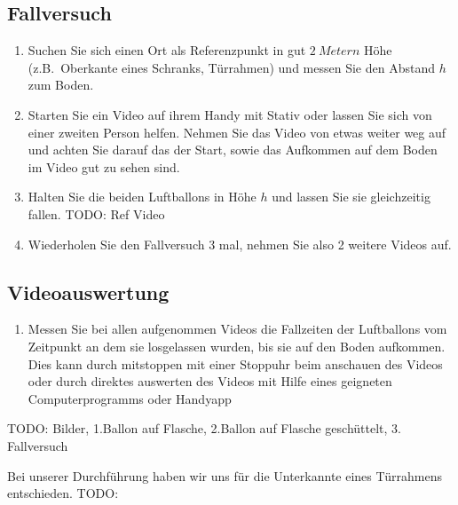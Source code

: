 \documentclass{article}
\begin{document}
        \subsection{Fallversuch}
            \begin{enumerate}[resume]
                \item Suchen Sie sich einen Ort als Referenzpunkt in gut \(\SI{2}{Metern}\) Höhe (z.B.\ Oberkante eines Schranks, Türrahmen) und messen Sie
                den Abstand \(h\) zum Boden.
                \item Starten Sie ein Video auf ihrem Handy mit Stativ oder lassen Sie sich von einer zweiten Person helfen.
                Nehmen Sie das Video von etwas weiter weg auf und achten Sie darauf das der Start, sowie das Aufkommen auf dem Boden im Video gut zu sehen sind.
                \item Halten Sie die beiden Luftballons in Höhe \(h\) und lassen Sie sie gleichzeitig fallen. TODO: Ref Video
                \item Wiederholen Sie den Fallversuch 3 mal, nehmen Sie also 2 weitere Videos auf.
            \end{enumerate}
            
        \subsection{Videoauswertung}
            \begin{enumerate}
                \item Messen Sie bei allen aufgenommen Videos die Fallzeiten der Luftballons vom Zeitpunkt an dem sie losgelassen wurden, bis sie auf den Boden aufkommen.
                Dies kann durch mitstoppen mit einer Stoppuhr beim anschauen des Videos oder durch direktes auswerten des Videos mit Hilfe eines geigneten Computerprogramms oder Handyapp
            \end{enumerate}
        TODO: Bilder, 1.Ballon auf Flasche, 2.Ballon auf Flasche geschüttelt, 3. Fallversuch

        Bei unserer Durchführung haben wir uns für die Unterkannte eines Türrahmens entschieden. TODO:
    
\end{document}

